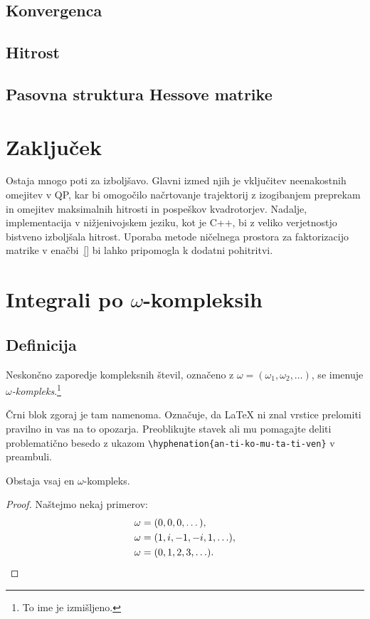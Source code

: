\documentclass[mat2, tisk]{fmfdelo}
\begin{document}
\subsection{Konvergenca}

\subsection{Hitrost}

\subsection{Pasovna struktura Hessove matrike}

\section{Zaključek}
\label{sec:zakljucek}

Ostaja mnogo poti za izboljšavo. Glavni izmed njih je vključitev neenakostnih omejitev v QP, kar bi omogočilo načrtovanje trajektorij z izogibanjem preprekam in omejitev maksimalnih hitrosti in pospeškov kvadrotorjev. Nadalje, implementacija v nižjenivojskem jeziku, kot je C++, bi z veliko verjetnostjo bistveno izboljšala hitrost. Uporaba metode ničelnega prostora za faktorizacijo matrike v enačbi~\eqref{} \cite{rees2014null} bi lahko pripomogla k dodatni pohitritvi.

\section{Integrali po \texorpdfstring{$\omega$}{ω}-kompleksih}
\subsection{Definicija}
\begin{definicija}
  Neskončno zaporedje kompleksnih števil, označeno z $\omega = (\omega_1, \omega_2, \ldots)$,
  se imenuje \emph{$\omega$-kompleks}.\footnote{To ime je izmišljeno.}

  Črni blok zgoraj je tam namenoma. Označuje, da \LaTeX{} ni znal vrstice prelomiti pravilno
  in vas na to opozarja. Preoblikujte stavek ali mu pomagajte deliti problematično besedo z
  ukazom \verb|\hyphenation{an-ti-ko-mu-ta-ti-ven}| v preambuli.
\end{definicija}
\begin{trditev}
  \label{trd:obstoj-omega}
  Obstaja vsaj en $\omega$-kompleks.
\end{trditev}
\begin{proof}
  Naštejmo nekaj primerov:
  \begin{align}
    \omega &= (0, 0, 0, \dots), \label{eq:zero-kompleks} \\
    \omega &= (1, i, -1, -i, 1, \ldots), \nonumber \\
    \omega &= (0, 1, 2, 3, \ldots). \nonumber \qedhere  %
  \end{align}
\end{proof}
\end{document}
